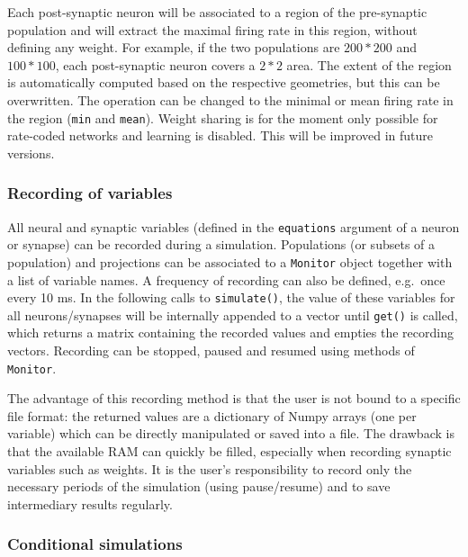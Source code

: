 \documentclass[
  11pt,
  a4paper,
]{scrbook}
\begin{document}
Each post-synaptic neuron will be associated to a region of the
pre-synaptic population and will extract the maximal firing rate in this
region, without defining any weight. For example, if the two populations
are \(200*200\) and \(100*100\), each post-synaptic neuron covers a
\(2*2\) area. The extent of the region is automatically computed based
on the respective geometries, but this can be overwritten. The operation
can be changed to the minimal or mean firing rate in the region
(\texttt{\textquotesingle{}min\textquotesingle{}} and
\texttt{\textquotesingle{}mean\textquotesingle{}}). Weight sharing is
for the moment only possible for rate-coded networks and learning is
disabled. This will be improved in future versions.

\subsubsection*{Recording of variables}\label{recording-of-variables}

All neural and synaptic variables (defined in the \texttt{equations}
argument of a neuron or synapse) can be recorded during a simulation.
Populations (or subsets of a population) and projections can be
associated to a \texttt{Monitor} object together with a list of variable
names. A frequency of recording can also be defined, e.g.~once every 10
ms. In the following calls to \texttt{simulate()}, the value of these
variables for all neurons/synapses will be internally appended to a
vector until \texttt{get()} is called, which returns a matrix containing
the recorded values and empties the recording vectors. Recording can be
stopped, paused and resumed using methods of \texttt{Monitor}.

The advantage of this recording method is that the user is not bound to
a specific file format: the returned values are a dictionary of Numpy
arrays (one per variable) which can be directly manipulated or saved
into a file. The drawback is that the available RAM can quickly be
filled, especially when recording synaptic variables such as weights. It
is the user's responsibility to record only the necessary periods of the
simulation (using pause/resume) and to save intermediary results
regularly.

\subsubsection*{Conditional simulations}\label{conditional-simulations}
\end{document}
